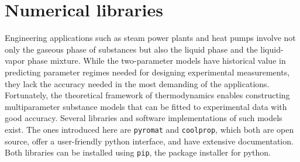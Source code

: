 \section{Numerical libraries}
Engineering applications such as steam power plants and heat pumps involve not only the gaseous phase of substances but also the liquid phase and the liquid-vapor phase mixture. While the two-parameter models have historical value in predicting parameter regimes needed for designing experimental measurements, they lack the accuracy needed in the most demanding of the applications. Fortunately, the theoretical framework of thermodynamics enables constructing multiparameter substance models that can be fitted to experimental data with good accuracy. Several libraries and software implementations of such models exist. The ones introduced here are \verb|pyromat| and \verb|coolprop|, which both are open source, offer a user-friendly python interface, and have extensive documentation. Both libraries can be installed using \verb|pip|, the package installer for python.

